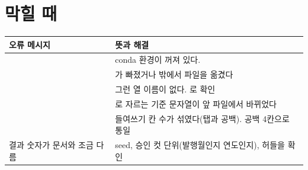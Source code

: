 \section{막힐 때}
\begin{table}[H]\centering\small
\begin{tabularx}{\linewidth}{@{}p{55mm}L@{}}\toprule
오류 메시지 & 뜻과 해결\\\midrule
{} & conda 환경이 꺼져 있다. \\
 & 가 빠졌거나  밖에서 파일을 옮겼다\\
 & 그런 열 이름이 없다. 로 확인\\
 & 로 자르는 기준 문자열이 앞 파일에서 바뀌었다\\
 & 들여쓰기 칸 수가 섞였다(탭과 공백). 공백 4칸으로 통일\\
결과 숫자가 문서와 조금 다름 & seed, 승인 컷 단위(발행월인지 연도인지), 허들을 확인\\\bottomrule
\end{tabularx}
\end{table}
